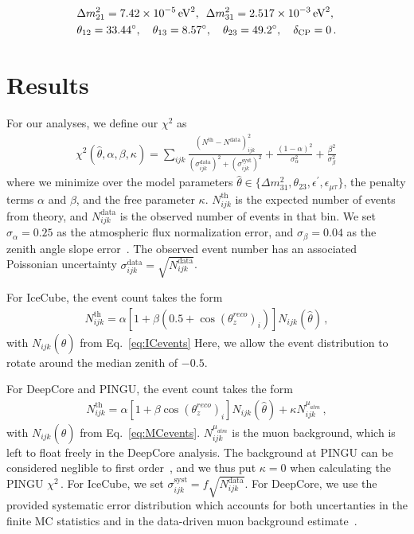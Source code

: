 \documentclass[draft=True]{revtex4-2}
\newcommand{\zreco}{\ensuremath{\cos{(\theta_z^{reco})}}}
\newcommand{\emt}{\ensuremath{\epsilon_{\mu\tau}}}
\newcommand{\ep}{\ensuremath{\epsilon^\prime}}
\newcommand{\dm}{\Delta m^2_{31}}
\begin{document}
\begin{align}\label{eq:PINGUparams}
    &\Delta m^2_{21} =  \SI{7.42e-5}{\electronvolt^2},\hspace{0.5em} \dm =  \SI{2.517e-3}{\electronvolt^2}, \nonumber \\
    &\theta_{12} = \SI{33.44}{\degree},\hspace{1em} \theta_{13} = \SI{8.57}{\degree},\hspace{1em} \theta_{23} = \SI{49.2}{\degree}, \hspace{1em} \delta_\text{CP} = 0\,.
\end{align}


\section{Results}
For our analyses, we define our $\chi^2$ as
\begin{align} \label{eq:ICchisq}
    \chi^{2}(\hat{\theta},\alpha,\beta, \kappa)=\sum_{ijk} \frac{\left(N^\text{th}-N^\text{data}\right)_{ijk}^{2}}
    {\left(\sigma^\text{data}_{ijk}\right)^{2} + \left(\sigma^\text{syst}_{ijk}\right)^{2}}+ 
    \frac{(1-\alpha)^2}{\sigma_\alpha^2} + \frac{\beta^2}{\sigma_\beta^2}\,
\end{align}
where we minimize over the model parameters $\hat{\theta} \in \{\dm, \theta_{23}, \ep, \emt\}$, the penalty terms $\alpha$ and $\beta$, and the free parameter $\kappa$.
$N_{ijk}^\text{th}$ is the expected number of events from theory, and $N_{ijk}^\text{data}$ is the observed number of events in that bin. We set $\sigma_\alpha = 0.25$ as the atmospheric flux normalization error, and $\sigma_\beta = 0.04$ as the zenith angle slope error~\cite{hondapaper}. 
The observed event number has an associated Poissonian uncertainty $\sigma_{ijk}^\text{data} = \sqrt{N_{ijk}^\text{data}}$.

For IceCube, the event count takes the form
\begin{align}
    N^\text{th}_{ijk} = \alpha\left[1+\beta (0.5 + \zreco_i )\right] N_{ijk}(\hat{\theta})\,,
\end{align}
with $N_{ijk}(\hat{\theta})$ from Eq.~\ref{eq:ICevents} Here, we allow the event distribution to rotate around the median zenith of $-0.5$.

For DeepCore and PINGU, the event count takes the form
\begin{align}
    N^\text{th}_{ijk} = \alpha\left[1+\beta \zreco_i \right] N_{ijk}(\hat{\theta}) + \kappa N_{ijk}^{\mu_{atm}}\,,
\end{align}
with $N_{ijk}(\hat{\theta})$ from Eq.~\ref{eq:MCevents}. $N_{ijk}^{\mu_{atm}}$ is the muon background, which is left to float freely in the DeepCore analysis.
The background at PINGU can be considered neglible to first order~\cite{PINGUdata}, and we thus put $\kappa=0$ when calculating the PINGU $\chi^2$\,.
For IceCube, we set $\sigma_{ijk}^\text{syst} = f\sqrt{N_{ijk}^\text{data}}$.
For DeepCore, we use the provided systematic error distribution which accounts for both uncertanties in the finite MC statistics and in the data-driven 
muon background estimate~\cite{DC2019data}.
\end{document}
